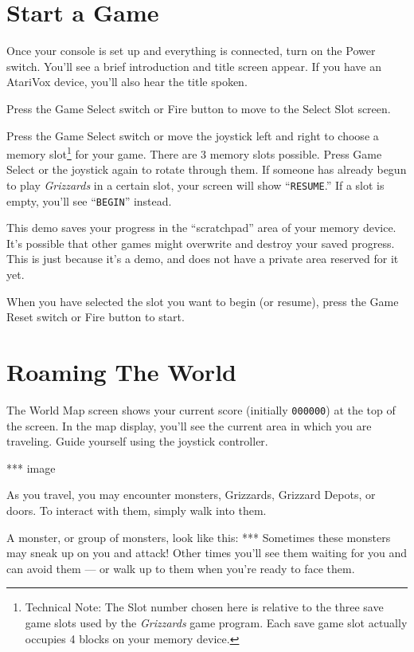 \documentclass[10pt,twocolumn,openany,article]{memoir}
\begin{document}
\fi

\section{Start a Game}
Once your  console is set  up and everything  is connected, turn  on the
Power switch. You'll  see a brief introduction and  title screen appear.
If you have an AtariVox device, you'll also hear the title spoken.

Press  the Game  Select switch  or  Fire button  to move  to the  Select
Slot screen.

Press the  Game Select  switch or  move the joystick  left and  right to
choose  a memory  slot\footnote{Technical Note:  The Slot  number chosen
  here  is  relative   to  the  three  save  game  slots   used  by  the
  \textit{Grizzards} game program. Each save game slot actually occupies
  4 blocks  on your memory  device.} for your  game. There are  3 memory
slots  possible. Press  Game  Select  or the  joystick  again to  rotate
through them. If someone has already begun to play \textit{Grizzards} in
a certain slot, your screen will  show ``\texttt{RESUME}.'' If a slot is
empty, you'll see ``\texttt{BEGIN}'' instead.

\ifdefined\DEMO
\skip
This  demo  saves your  progress  in  the  ``scratchpad'' area  of  your
memory  device.  It's possible  that  other  games might  overwrite  and
destroy your saved progress. This is  just because it's a demo, and does
not have a private area reserved for it yet.
\skip
\fi

When you have selected the slot you want to begin (or resume), press the
Game Reset switch or Fire button to start.

\section{Roaming The World}

\ifdefined\TVNTSC \else  The World Map  screen shows your  current score
(initially \texttt{000000})  at the top  of the  screen. \fi In  the map
display,  you'll  see the  current  area  in  which you  are  traveling.
Guide yourself using the joystick controller.

*** image

As   you  travel,   you   may  encounter   monsters,\ifdefined\DEMO\else
Grizzards, \fi Grizzard Depots, or  doors. To interact with them, simply
walk into them.

A monster,  or group of  monsters, look  like this: ***  Sometimes these
monsters may  sneak up on  you and attack!  Other times you'll  see them
waiting for you  and can avoid them  --- or walk up to  them when you're
ready to face them.
\end{document}
